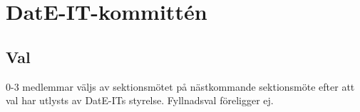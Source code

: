 \section{DatE-IT-kommittén}
\subsection{Val}
  0-3 medlemmar väljs av sektionsmötet på nästkommande sektionsmöte efter att val har utlysts av DatE-ITs styrelse. Fyllnadsval föreligger ej.
